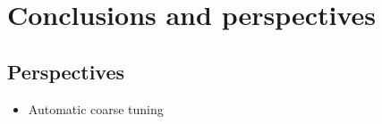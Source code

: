 \documentclass[oneside,12t]{classes/Thesis}
\begin{document}






\chapter{Conclusions and perspectives}
\minitoc
\vspace{1cm}

\section{Perspectives}
  \begin{itemize}
    \item Automatic coarse tuning
  \end{itemize}



\backmatter %
%
\appendix



\end{document}
